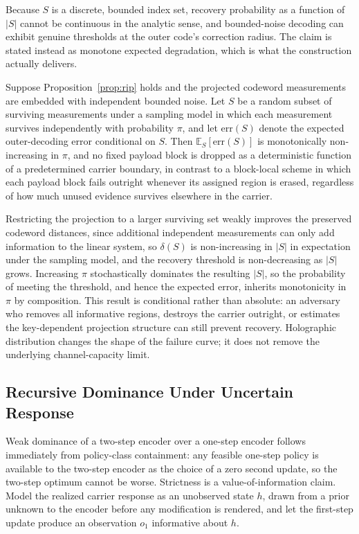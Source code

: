 Because $S$ is a discrete, bounded index set, recovery probability as a function of $|S|$ cannot be continuous in the analytic sense, and bounded-noise decoding can exhibit genuine thresholds at the outer code's correction radius. The claim is stated instead as monotone expected degradation, which is what the construction actually delivers.

\begin{proposition}
\label{prop:erasure}
Suppose Proposition~\ref{prop:rip} holds and the projected codeword measurements are embedded with independent bounded noise. Let $S$ be a random subset of surviving measurements under a sampling model in which each measurement survives independently with probability $\pi$, and let $\mathrm{err}(S)$ denote the expected outer-decoding error conditional on $S$. Then $\mathbb{E}_S[\mathrm{err}(S)]$ is monotonically non-increasing in $\pi$, and no fixed payload block is dropped as a deterministic function of a predetermined carrier boundary, in contrast to a block-local scheme in which each payload block fails outright whenever its assigned region is erased, regardless of how much unused evidence survives elsewhere in the carrier.
\end{proposition}

Restricting the projection to a larger surviving set weakly improves the preserved codeword distances, since additional independent measurements can only add information to the linear system, so $\delta(S)$ is non-increasing in $|S|$ in expectation under the sampling model, and the recovery threshold is non-decreasing as $|S|$ grows. Increasing $\pi$ stochastically dominates the resulting $|S|$, so the probability of meeting the threshold, and hence the expected error, inherits monotonicity in $\pi$ by composition. This result is conditional rather than absolute: an adversary who removes all informative regions, destroys the carrier outright, or estimates the key-dependent projection structure can still prevent recovery. Holographic distribution changes the shape of the failure curve; it does not remove the underlying channel-capacity limit.

\subsection{Recursive Dominance Under Uncertain Response}

Weak dominance of a two-step encoder over a one-step encoder follows immediately from policy-class containment: any feasible one-step policy is available to the two-step encoder as the choice of a zero second update, so the two-step optimum cannot be worse. Strictness is a value-of-information claim. Model the realized carrier response as an unobserved state $h$, drawn from a prior unknown to the encoder before any modification is rendered, and let the first-step update produce an observation $o_1$ informative about $h$.

